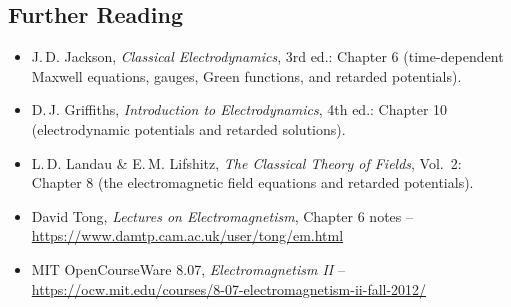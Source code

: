 \subsection*{Further Reading}
\begin{itemize}
  \item J.\,D. Jackson, \textit{Classical Electrodynamics}, 3rd ed.: Chapter 6 (time-dependent Maxwell equations, gauges, Green functions, and retarded potentials).
  \item D.\,J. Griffiths, \textit{Introduction to Electrodynamics}, 4th ed.: Chapter 10 (electrodynamic potentials and retarded solutions).
  \item L.\,D. Landau \& E.\,M. Lifshitz, \textit{The Classical Theory of Fields}, Vol.\ 2: Chapter 8 (the electromagnetic field equations and retarded potentials).
  \item David Tong, \textit{Lectures on Electromagnetism}, Chapter 6 notes -- \url{https://www.damtp.cam.ac.uk/user/tong/em.html}
  \item MIT OpenCourseWare 8.07, \textit{Electromagnetism II} -- \url{https://ocw.mit.edu/courses/8-07-electromagnetism-ii-fall-2012/}
\end{itemize}
